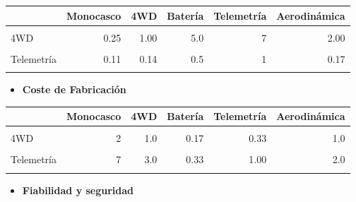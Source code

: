 \documentclass[
]{article}
\providecommand{\tightlist}{%
  \setlength{\itemsep}{0pt}\setlength{\parskip}{0pt}}
\begin{document}
\begin{longtable}[t]{lrrrrr}
\toprule
 & Monocasco & 4WD & Batería & Telemetría & Aerodinámica\\
\midrule
\cellcolor{gray!10}{Monocasco} & \cellcolor{gray!10}{1.00} & \cellcolor{gray!10}{4.00} & \cellcolor{gray!10}{8.0} & \cellcolor{gray!10}{9} & \cellcolor{gray!10}{2.00}\\
4WD & 0.25 & 1.00 & 5.0 & 7 & 2.00\\
\cellcolor{gray!10}{Batería} & \cellcolor{gray!10}{0.12} & \cellcolor{gray!10}{0.20} & \cellcolor{gray!10}{1.0} & \cellcolor{gray!10}{2} & \cellcolor{gray!10}{0.25}\\
Telemetría & 0.11 & 0.14 & 0.5 & 1 & 0.17\\
\cellcolor{gray!10}{Aerodinámica} & \cellcolor{gray!10}{0.50} & \cellcolor{gray!10}{0.50} & \cellcolor{gray!10}{4.0} & \cellcolor{gray!10}{6} & \cellcolor{gray!10}{1.00}\\
\bottomrule
\end{longtable}

\begin{itemize}
\tightlist
\item
  \textbf{Coste de Fabricación}
\end{itemize}

\begin{longtable}[t]{lrrrrr}
\toprule
 & Monocasco & 4WD & Batería & Telemetría & Aerodinámica\\
\midrule
\cellcolor{gray!10}{Monocasco} & \cellcolor{gray!10}{1} & \cellcolor{gray!10}{0.5} & \cellcolor{gray!10}{0.11} & \cellcolor{gray!10}{0.14} & \cellcolor{gray!10}{0.2}\\
4WD & 2 & 1.0 & 0.17 & 0.33 & 1.0\\
\cellcolor{gray!10}{Batería} & \cellcolor{gray!10}{9} & \cellcolor{gray!10}{6.0} & \cellcolor{gray!10}{1.00} & \cellcolor{gray!10}{3.00} & \cellcolor{gray!10}{6.0}\\
Telemetría & 7 & 3.0 & 0.33 & 1.00 & 2.0\\
\cellcolor{gray!10}{Aerodinámica} & \cellcolor{gray!10}{5} & \cellcolor{gray!10}{1.0} & \cellcolor{gray!10}{0.17} & \cellcolor{gray!10}{0.50} & \cellcolor{gray!10}{1.0}\\
\bottomrule
\end{longtable}

\begin{itemize}
\tightlist
\item
  \textbf{Fiabilidad y seguridad}
\end{itemize}
\end{document}
